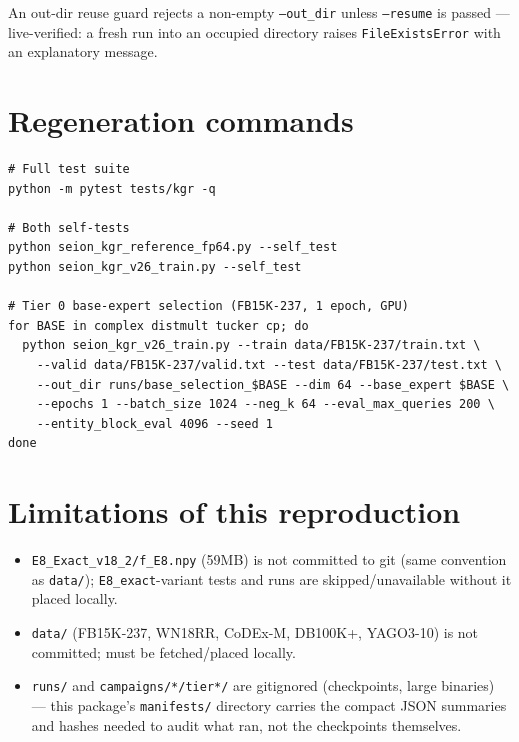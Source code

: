 \documentclass[11pt]{article}
\begin{document}
An out-dir reuse guard rejects a non-empty \texttt{--out\_dir} unless \texttt{--resume} is passed
--- live-verified: a fresh run into an occupied directory raises \texttt{FileExistsError} with an
explanatory message.

\section{Regeneration commands}
\begin{lstlisting}[basicstyle=\ttfamily\small]
# Full test suite
python -m pytest tests/kgr -q

# Both self-tests
python seion_kgr_reference_fp64.py --self_test
python seion_kgr_v26_train.py --self_test

# Tier 0 base-expert selection (FB15K-237, 1 epoch, GPU)
for BASE in complex distmult tucker cp; do
  python seion_kgr_v26_train.py --train data/FB15K-237/train.txt \
    --valid data/FB15K-237/valid.txt --test data/FB15K-237/test.txt \
    --out_dir runs/base_selection_$BASE --dim 64 --base_expert $BASE \
    --epochs 1 --batch_size 1024 --neg_k 64 --eval_max_queries 200 \
    --entity_block_eval 4096 --seed 1
done
\end{lstlisting}

\section{Limitations of this reproduction}
\begin{itemize}
  \item \texttt{E8\_Exact\_v18\_2/f\_E8.npy} (59MB) is not committed to git (same convention as
        \texttt{data/}); \texttt{E8\_exact}-variant tests and runs are skipped/unavailable without
        it placed locally.
  \item \texttt{data/} (FB15K-237, WN18RR, CoDEx-M, DB100K+, YAGO3-10) is not committed; must be
        fetched/placed locally.
  \item \texttt{runs/} and \texttt{campaigns/*/tier*/} are gitignored (checkpoints, large binaries)
        --- this package's \texttt{manifests/} directory carries the compact JSON summaries and
        hashes needed to audit what ran, not the checkpoints themselves.
\end{itemize}
\end{document}
